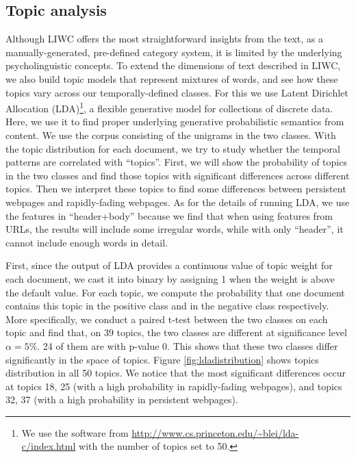 \documentclass[phd,tocprelim]{cornell}
\begin{document}
\subsection{Topic analysis}

Although LIWC offers the most straightforward insights from the text, as a manually-generated, pre-defined category system, it is limited by the underlying psycholinguistic concepts.
To extend the dimensions of text described in LIWC, we also build topic models that represent mixtures of words,
and see how these topics vary across our temporally-defined classes.
For this we use 
Latent Dirichlet Allocation (LDA)\footnote{We use the software
from \url{http://www.cs.princeton.edu/~blei/lda-c/index.html}
with the number of topics set to 50.
}, a flexible generative model for collections of discrete data\cite{Blei:03}. Here, we use it to find proper underlying generative probabilistic semantics from content. We use the corpus consisting of the unigrams in the two classes. 
With the topic distribution for each document, we try to study whether the temporal patterns are correlated with ``topics''. 
First, we will show the probability of topics in the two classes and find those topics with significant differences across different topics.  
Then we interpret these topics to find some differences between
persistent webpages and rapidly-fading webpages. As for the details of
running LDA, we use the features in ``header+body'' because we find
that when using features from URLs, the results will include some
irregular words, while with only ``header'', it cannot include enough
words in detail. 

First, since the output of LDA provides a
continuous value of topic weight for each document, we cast it into binary by assigning 1 when the weight is above the default value. For each topic, we compute the probability that one
document contains this topic in the positive class and in the negative class
respectively. More specifically, we conduct a paired t-test between the two classes on each topic and find that, on 39 topics, the two classes are  different at significance level $\alpha=5\%$. 24 of them are with p-value $0$. This shows that these two classes differ significantly in the space of topics.
Figure \ref{fig:ldadistribution} shows topics distribution in all 50 topics.  
We notice that the most significant differences occur at topics 18, 25 (with a high probability in rapidly-fading webpages), and topics 32, 37 (with a high probability in persistent webpages).
\end{document}
